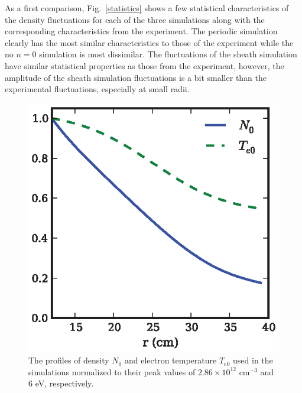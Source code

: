 \documentclass[showpacs,preprintnumbers,amsmath,amssymb,superscriptaddress,aip]{revtex4-1}
\begin{document}
As a first comparison, Fig.~\ref{statistics} shows a few statistical characteristics of the density fluctuations for each of the three simulations along with the corresponding
characteristics from the experiment. The periodic simulation clearly has the most similar characteristics to those of the experiment while the no $n=0$ simulation is most dissimilar.
The fluctuations of the sheath simulation have similar statistical properties as those from the experiment, however, 
the amplitude of the sheath simulation fluctuations is a bit smaller than the experimental fluctuations, especially at small radii.

\begin{figure}[!htbp]
\includegraphics[]{equilibrium_profiles}
\hfil
\caption{The profiles of density $N_0$ and electron temperature $T_{e0}$ used in the simulations normalized to their peak values of $2.86 \times 10^{12}$ cm$^{-3}$ and 
$6$ eV, respectively.}
\label{eq_profiles}
\end{figure}
\end{document}
